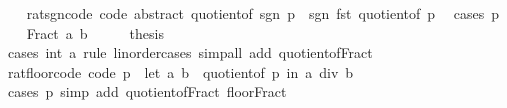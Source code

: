 \begin{isabellebody}
\endisatagproof
{\isafoldproof}%
%
\isadelimproof
\isanewline
%
\endisadelimproof
\ \ \isanewline
{}\isamarkupfalse%
\ rat{\isacharunderscore}{\kern0pt}sgn{\isacharunderscore}{\kern0pt}code\ {\isacharbrackleft}{\kern0pt}code\ abstract{\isacharbrackright}{\kern0pt}{\isacharcolon}{\kern0pt}\ {\isachardoublequoteopen}quotient{\isacharunderscore}{\kern0pt}of\ {\isacharparenleft}{\kern0pt}sgn\ p{\isacharparenright}{\kern0pt}\ {\isacharequal}{\kern0pt}\ {\isacharparenleft}{\kern0pt}sgn\ {\isacharparenleft}{\kern0pt}fst\ {\isacharparenleft}{\kern0pt}quotient{\isacharunderscore}{\kern0pt}of\ p{\isacharparenright}{\kern0pt}{\isacharparenright}{\kern0pt}{\isacharcomma}{\kern0pt}\ {}{\isacharparenright}{\kern0pt}{\isachardoublequoteclose}\isanewline
%
\isadelimproof
%
\endisadelimproof
%
\isatagproof
{}\isamarkupfalse%
\ {\isacharparenleft}{\kern0pt}cases\ p{\isacharparenright}{\kern0pt}\isanewline
\ \ \isamarkupfalse%
\ {\isacharparenleft}{\kern0pt}Fract\ a\ b{\isacharparenright}{\kern0pt}\isanewline
\ \ \isamarkupfalse%
\ \isamarkupfalse%
\ {\isacharquery}{\kern0pt}thesis\isanewline
\ \ \ \ \isamarkupfalse%
\ {\isacharparenleft}{\kern0pt}cases\ {\isachardoublequoteopen}{}{\isacharcolon}{\kern0pt}{\isacharcolon}{\kern0pt}int{\isachardoublequoteclose}\ a\ rule{\isacharcolon}{\kern0pt}\ linorder{\isacharunderscore}{\kern0pt}cases{\isacharparenright}{\kern0pt}\ {\isacharparenleft}{\kern0pt}simp{\isacharunderscore}{\kern0pt}all\ add{\isacharcolon}{\kern0pt}\ quotient{\isacharunderscore}{\kern0pt}of{\isacharunderscore}{\kern0pt}Fract{\isacharparenright}{\kern0pt}\isanewline
{}\isamarkupfalse%
%
\endisatagproof
{\isafoldproof}%
%
\isadelimproof
\isanewline
%
\endisadelimproof
\isanewline
{}\isamarkupfalse%
\ rat{\isacharunderscore}{\kern0pt}floor{\isacharunderscore}{\kern0pt}code\ {\isacharbrackleft}{\kern0pt}code{\isacharbrackright}{\kern0pt}{\isacharcolon}{\kern0pt}\ {\isachardoublequoteopen}{\isasymlfloor}p{\isasymrfloor}\ {\isacharequal}{\kern0pt}\ {\isacharparenleft}{\kern0pt}let\ {\isacharparenleft}{\kern0pt}a{\isacharcomma}{\kern0pt}\ b{\isacharparenright}{\kern0pt}\ {\isacharequal}{\kern0pt}\ quotient{\isacharunderscore}{\kern0pt}of\ p\ in\ a\ div\ b{\isacharparenright}{\kern0pt}{\isachardoublequoteclose}\isanewline
%
\isadelimproof
\ \ %
\endisadelimproof
%
\isatagproof
{}\isamarkupfalse%
\ {\isacharparenleft}{\kern0pt}cases\ p{\isacharparenright}{\kern0pt}\ {\isacharparenleft}{\kern0pt}simp\ add{\isacharcolon}{\kern0pt}\ quotient{\isacharunderscore}{\kern0pt}of{\isacharunderscore}{\kern0pt}Fract\ floor{\isacharunderscore}{\kern0pt}Fract{\isacharparenright}{\kern0pt}%

\end{isabellebody}

